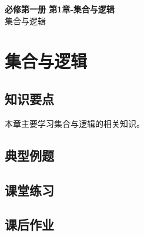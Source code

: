 \documentclass[12pt,a4paper]{article}
\begin{document}
\begin{center}
\LARGE\textbf{必修第一册 第1章-集合与逻辑} \\[0.5em]
\large 集合与逻辑
\end{center}

\tableofcontents
\newpage

\section{集合与逻辑}

\subsection{知识要点}
本章主要学习集合与逻辑的相关知识。

\subsection{典型例题}

\subsection{课堂练习}

\subsection{课后作业}
\end{document}
